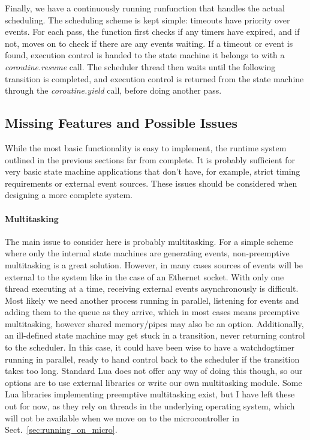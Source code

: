 Finally, we have a continuously running \guillemotleft run\guillemotright  function that handles the actual scheduling. The scheduling scheme is kept simple: timeouts have priority over events. For each pass, the function first checks if any timers have expired, and if not, moves on to check if there are any events waiting. If a timeout or event is found, execution control is handed to the state machine it belongs to with a \emph{coroutine.resume} call. The scheduler thread then waits until the following transition is completed, and execution control is returned from the state machine through the \emph{coroutine.yield} call, before doing another pass.

\subsection{Missing Features and Possible Issues}
While the most basic functionality is easy to implement, the runtime system outlined in the previous sections far from complete. It is probably sufficient for very basic state machine applications that don't have, for example, strict timing requirements or external event sources. These issues should be considered when designing a more complete system.

\paragraph{Multitasking} The main issue to consider here is probably multitasking. For a simple scheme where only the internal state machines are generating events, non-preemptive multitasking is a great solution. However, in many cases sources of events will be external to the system like in the case of an Ethernet socket. With only one thread executing at a time, receiving external events asynchronously is difficult. Most likely we need another process running in parallel, listening for events and adding them to the queue as they arrive, which in most cases means preemptive multitasking, however shared memory/pipes may also be an option. Additionally, an ill-defined state machine may get stuck in a transition, never returning control to the scheduler. In this case, it could have been wise to have a \guillemotleft watchdog\guillemotright timer running in parallel, ready to hand control back to the scheduler if the transition takes too long. Standard Lua does not offer any way of doing this though, so our options are to use external libraries or write our own multitasking module. Some Lua libraries implementing preemptive multitasking exist, but I have left these out for now, as they rely on threads in the underlying operating system, which will not be available when we move on to the microcontroller in Sect.~\ref{sec:running_on_micro}.

